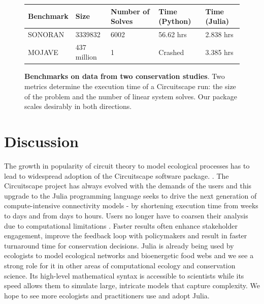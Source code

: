 \documentclass{juliacon}
\begin{document}
\begin{figure}
\begin{tabular}{|l|l|l|l|l|}
\hline
\textbf{Benchmark} & \textbf{Size} & \textbf{Number of Solves} & \textbf{Time (Python)} & \textbf{Time (Julia)} \\ \hline
SONORAN            & 3339832       & 6002                      & 56.62 hrs              & 2.838 hrs             \\ \hline
MOJAVE             & 437 million   & 1                         & Crashed                & 3.385 hrs             \\ \hline
\end{tabular}
\centering
\caption{\textbf{Benchmarks on data from two conservation studies}. Two metrics determine the execution time of a Circuitscape run: the size of the problem and the number of linear system solves. Our package scales desirably in both directions. }
\label{table:bench}
\end{figure}

\section{Discussion}

The growth in popularity of circuit theory to model ecological processes has to lead to widespread adoption of the Circuitscape software package. \cite{mcrae_shah_mohapatra_anantharaman}. The Circuitscape project has always evolved with the demands of the users and this upgrade to the Julia programming language seeks to drive the next generation of compute-intensive connectivity models - by shortening execution time from weeks to days and from days to hours. Users no longer have to coarsen their analysis due to computational limitations \cite{drake2017using}. Faster results often enhance stakeholder engagement, improve the feedback loop with policymakers and result in faster turnaround time for conservation decisions. Julia is already being used by ecologists to model ecological networks \cite{timothee_poisot_2018_1438428} and bioenergetic food webs \cite{delmas_eva_2019_2584373} and we see a strong role for it in other areas of computational ecology and conservation science. Its high-level mathematical syntax is accessible to scientists while its speed allows them to simulate large, intricate models that capture complexity. We hope to see more ecologists and practitioners use and adopt Julia. 
\end{document}
